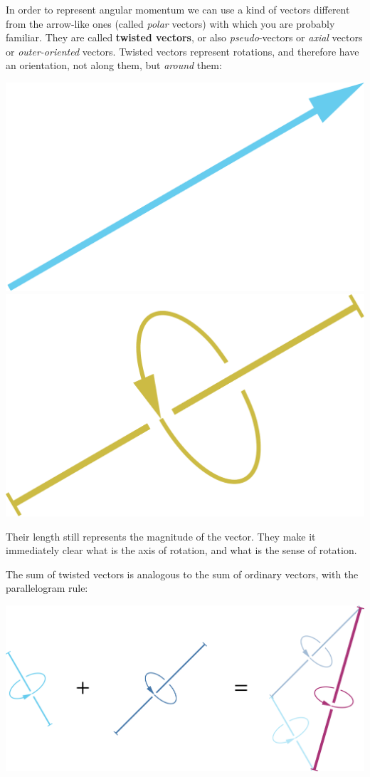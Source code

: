 \documentclass[a4paper,12pt,%
onecolumn,oneside,titlepage,%
british%
]{memoir}
\renewcommand*{\|}[1][]{\nonscript\:#1\vert\nonscript\:\mathopen{}}
\begin{document}
In order to represent angular momentum we can use a kind of vectors different from the arrow-like ones (called \emph{polar} vectors) with which you are probably familiar. They are called \textbf{twisted vectors}, or also \emph{pseudo}-vectors or \emph{axial} vectors or \emph{outer-oriented} vectors. Twisted vectors represent rotations, and therefore have an orientation, not along them, but \emph{around} them:
\begin{center}
\includegraphics[width=0.34\linewidth]{io-vector.pdf}%
\hspace*{0.12\linewidth}\includegraphics[width=0.34\linewidth]{oo-vector.pdf}%
%
\\\footnotesize
{}\hspace*{0.46\linewidth}
\end{center}
Their length still represents the magnitude of the vector. They make it immediately clear what is the axis of rotation, and what is the sense of rotation.

The sum of twisted vectors is analogous to the sum of ordinary vectors, with the parallelogram rule:
\begin{center}
\includegraphics[width=0.67\linewidth]{tvectorsum.pdf}%
\end{center}
\end{document}
